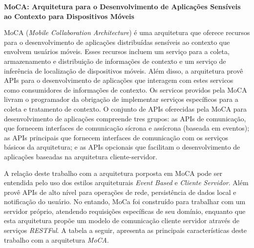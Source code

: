 \textbf{MoCA: Arquitetura para o Desenvolvimento de Aplicações Sensíveis ao Contexto para Dispositivos Móveis}\par
MoCA (\textit{Mobile Collaboration Architecture}) é uma arquitetura que oferece recursos para o desenvolvimento de aplicações distribuídas sensíveis ao contexto que envolvem usuários móveis. Esses recursos incluem um serviço para a coleta, armazenamento e distribuição de informações de contexto e um serviço de inferência de localização de dispositivos móveis. Além disso, a arquitetura provê APIs para o desenvolvimento de aplicações que interagem com estes servicos como consumidores de informações de contexto. Os servicos providos pela MoCA livram o programador da obrigação de implementar serviços específicos para a coleta e tratamento de contexto. O conjunto de APIs oferecidas pela MoCA para desenvolvimento de aplicações compreende tres grupos: as APIs de comunicação, que fornecem interfaces de comunicação sícrona e assícrona (baseada em eventos); as APIs principais que fornecem interfaces de comunicação com os serviços básicos da arquitetura; e as APIs opcionais que facilitam o desenvolvimento de aplicações baseadas na arquitetura cliente-servidor.\par

A relação deste trabalho com a arquitetura porposta em MoCA pode ser entendida pelo uso dos estilos arquiteturais \textit{Event Based} e \textit{Cliente Servidor}. Além provê APIs de alto nível para operações de rede, persistência de dados local e notificação do usuário. No entando, MoCa foi construído para trabalhar com um servidor próprio, atendendo requisições específicas de seu domínio, enquanto que esta arquitetura propõe um modelo de comunicação cliente servidor através de serviços \textit{RESTFul}. A tabela a seguir, apresenta as principais características deste trabalho com a arquitetura \textit{MoCA}.

